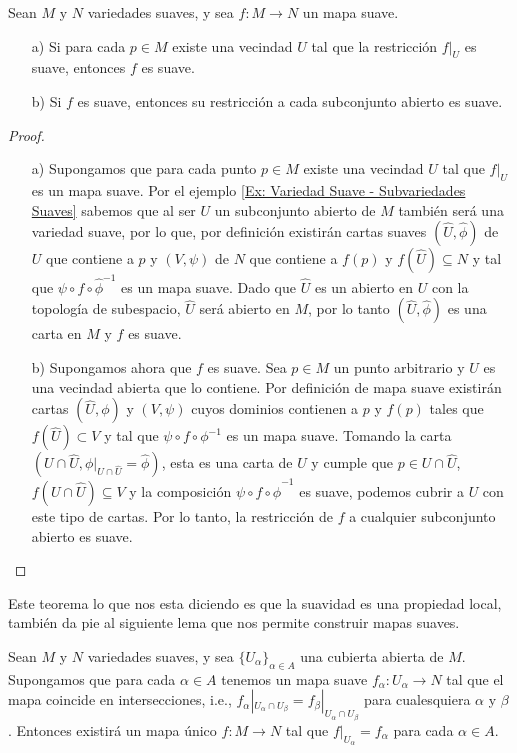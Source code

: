 \begin{theorem}
	Sean $M$ y $N$ variedades suaves, y sea $f: M \to N$ un mapa suave.
	\begin{itemize}
		\item [a)] Si para cada $p \in M$ existe una vecindad $U$ tal que la restricción $f|_U$ es suave, entonces $f$ es suave.
		\item [b)] Si $f$ es suave, entonces su restricción a cada subconjunto abierto es suave.
	\end{itemize}
\end{theorem}

\begin{proof}
	\begin{itemize}
		\item[a)] Supongamos que para cada punto $p \in M$ existe una vecindad $U$ tal que $f|_U$ es un mapa suave. Por el ejemplo \ref{Ex: Variedad Suave - Subvariedades Suaves} sabemos que al ser $U$ un subconjunto abierto de $M$ también será una variedad suave, por lo que, por definición existirán cartas suaves $(\hat{U},\hat{\phi})$ de $U$ que contiene a $p$ y $(V,\psi)$ de $N$ que contiene a $f(p)$ y $f(\hat{U}) \subseteq N$ y tal que $\psi \circ f \circ \hat{\phi}^{-1}$ es un mapa suave. Dado que $\hat{U}$ es un abierto en $U$ con la topología de subespacio, $\hat{U}$ será abierto en $M$, por lo tanto $(\hat{U},\hat{\phi})$ es una carta en $M$ y $f$ es suave.

		\item [b)] Supongamos ahora que $f$ es suave. Sea $p \in M$ un punto arbitrario y $U$ es una vecindad abierta que lo contiene. Por definición de mapa suave existirán cartas $(\hat{U}, \phi)$ y $(V,\psi)$ cuyos dominios contienen a $p$ y $f(p)$ tales que $f(\hat{U}) \subset V$ y tal que $\psi \circ f \circ \phi^{-1}$ es un mapa suave. Tomando la carta $(U \cap \hat{U},\phi|_{U \cap \hat{U}} = \hat{\phi})$, esta es una carta de $U$ y cumple que $p \in U \cap \hat{U}$, $f(U \cap \hat{U}) \subseteq V$ y la composición $\psi \circ f \circ \hat{\phi}^{-1}$ es suave, podemos cubrir a $U$ con este tipo de cartas. Por lo tanto, la restricción de $f$ a cualquier subconjunto abierto es suave.
	\end{itemize}
\end{proof}

Este teorema lo que nos esta diciendo es que la suavidad es una propiedad local, también da pie al siguiente lema que nos permite construir mapas suaves.

\begin{corollary}
	Sean $M$ y $N$ variedades suaves, y sea $\{U_{\alpha}\}_{\alpha \in A}$ una cubierta abierta de $M$. Supongamos que para cada $\alpha \in A$ tenemos un mapa suave $f_{\alpha}: U_{\alpha} \to N$ tal que el mapa coincide en intersecciones, i.e., $f_{\alpha}|_{U_\alpha \cap U_\beta} = f_{\beta}|_{U_\alpha \cap U_\beta}$ para cualesquiera $\alpha$ y $\beta$. Entonces existirá un mapa único $f:M \to N$ tal que $f|_{U_\alpha} = f_{\alpha}$ para cada $\alpha \in A$.
\end{corollary}


